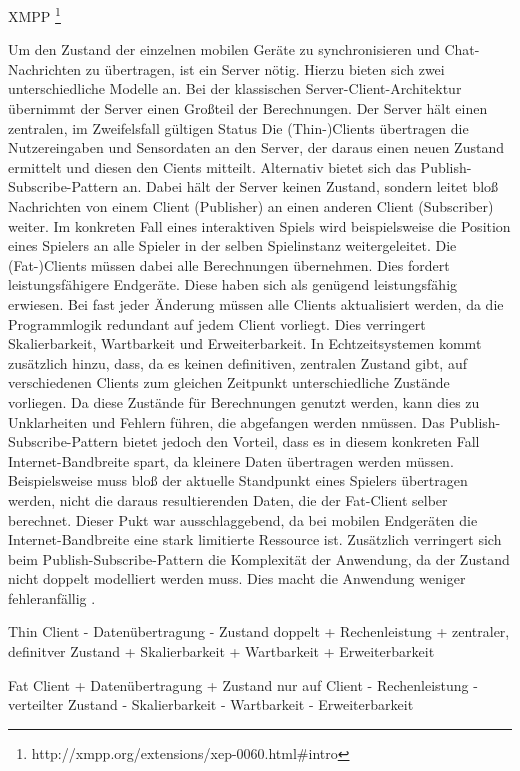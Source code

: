 XMPP \footnote{http://xmpp.org/extensions/xep-0060.html#intro}

Um den Zustand der einzelnen mobilen Geräte zu synchronisieren und Chat-Nachrichten zu übertragen, ist ein Server nötig.
Hierzu bieten sich zwei unterschiedliche Modelle an.
Bei der klassischen Server-Client-Architektur übernimmt der Server einen Großteil der Berechnungen.
Der Server hält einen zentralen, im Zweifelsfall gültigen Status
Die (Thin-)Clients übertragen die Nutzereingaben und Sensordaten an den Server, der daraus einen neuen Zustand ermittelt und diesen den Cients mitteilt.
Alternativ bietet sich das Publish-Subscribe-Pattern an. 
Dabei hält der Server keinen Zustand, sondern leitet bloß Nachrichten von einem Client (Publisher) an einen anderen Client (Subscriber) weiter.
Im konkreten Fall eines interaktiven Spiels wird beispielsweise die Position eines Spielers an alle Spieler in der selben Spielinstanz weitergeleitet.
Die (Fat-)Clients müssen dabei alle Berechnungen übernehmen. Dies fordert leistungsfähigere Endgeräte. Diese haben sich als genügend leistungsfähig erwiesen.
Bei fast jeder Änderung müssen alle Clients aktualisiert werden, da die Programmlogik redundant auf jedem Client vorliegt. Dies verringert Skalierbarkeit, Wartbarkeit und Erweiterbarkeit. In Echtzeitsystemen kommt zusätzlich hinzu, dass, da es keinen definitiven, zentralen Zustand gibt, auf verschiedenen Clients zum gleichen Zeitpunkt unterschiedliche Zustände vorliegen. Da diese Zustände für Berechnungen genutzt werden, kann dies zu Unklarheiten und Fehlern führen, die abgefangen werden nmüssen.
Das Publish-Subscribe-Pattern bietet jedoch den Vorteil, dass es in diesem konkreten Fall Internet-Bandbreite spart, da kleinere Daten übertragen werden müssen. Beispielsweise muss bloß der aktuelle Standpunkt eines Spielers übertragen werden, nicht die daraus resultierenden Daten, die der Fat-Client selber berechnet.
Dieser Pukt war ausschlaggebend, da bei mobilen Endgeräten die Internet-Bandbreite eine stark limitierte Ressource ist.
Zusätzlich verringert sich beim Publish-Subscribe-Pattern die Komplexität der Anwendung, da der Zustand nicht doppelt modelliert werden muss. Dies macht die Anwendung weniger fehleranfällig \cite{xmpp, http://www.sigs.de/publications/js/2003/01/schaeffer_JS_01_03.pdf}.

Thin Client
- Datenübertragung
- Zustand doppelt
+ Rechenleistung
+ zentraler, definitver Zustand
+ Skalierbarkeit
+ Wartbarkeit
+ Erweiterbarkeit

Fat Client
+ Datenübertragung
+ Zustand nur auf Client
- Rechenleistung
- verteilter Zustand
- Skalierbarkeit
- Wartbarkeit
- Erweiterbarkeit

